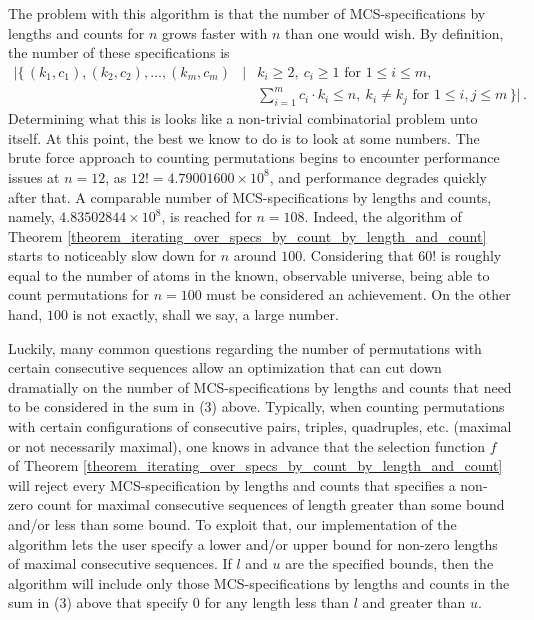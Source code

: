 \documentclass{article}
\begin{document}
The problem with this algorithm is that the number of MCS-specifications by lengths and counts
for $n$ grows faster with $n$ than one would wish. By definition, the number of these specifications is
\begin{eqnarray*}
  \big|\{\,(k_1, c_1), (k_2, c_2), \ldots,(k_m, c_m) & \mid & k_i \geq 2,\ c_i \geq 1 \text{ for } 1\leq i \leq m,\\
                                                 &      & \sum_{i=1}^m c_i \cdot k_i \leq n,\
                                                          k_i\neq k_j\text{ for } 1\leq i,j \leq m \,\}\big|\,.
\end{eqnarray*}
Determining what this is looks like a non-trivial combinatorial problem unto itself.
At this point, the best we know to do is to look at some numbers. The brute force
approach to counting permutations begins to encounter performance issues at $n=12$, as
$12!=4.79001600\times 10^8$, and performance degrades quickly after that.
A comparable number of MCS-specifications by lengths and counts,
namely, $4.83502844\times 10^8$, is reached for $n=108$. Indeed, the algorithm of Theorem
\ref{theorem_iterating_over_specs_by_count_by_length_and_count} starts to noticeably slow
down for $n$ around $100$. Considering that $60!$ is roughly equal to the number of atoms
in the known, observable universe, being able to count permutations for $n=100$ must be
considered an achievement. On the other hand, $100$ is not exactly, shall we say, a large number.

Luckily, many common questions regarding the number of permutations with certain consecutive
sequences allow an optimization that can cut down dramatially on the number of MCS-specifications
by lengths and counts that need to be considered in the sum in (3) above. Typically, when counting
permutations with certain configurations of consecutive pairs, triples, quadruples, etc.
(maximal or not necessarily maximal), one knows in advance that the selection function $f$ of
Theorem \ref{theorem_iterating_over_specs_by_count_by_length_and_count} will reject every
MCS-specification by lengths and counts that specifies a non-zero count for maximal consecutive
sequences of length greater than some bound and/or less than some bound. To exploit that,
our implementation of the algorithm \cite{Algos} lets the user specify a
lower and/or upper bound for non-zero lengths
of maximal consecutive sequences. If $l$ and $u$ are the specified bounds, then the algorithm
will include only those MCS-specifications by lengths and counts in the sum in (3) above that
specify 0 for any length less than $l$ and greater than $u$.
\end{document}
